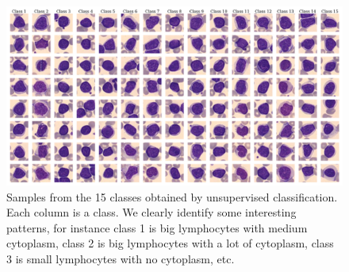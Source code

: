 \documentclass{midl}
\begin{document}
\begin{figure}[H]
    \centering
    \includegraphics[width=\textwidth]{figures/unsupervised_classification.png}
    \caption{Samples from the 15 classes obtained by unsupervised classification. Each column is a class. We clearly identify some interesting patterns, for instance class 1 is big lymphocytes with medium cytoplasm, class 2 is big lymphocytes with a lot of cytoplasm, class 3 is small lymphocytes with no cytoplasm, etc.}
    \label{fig:unsupervised_classification}
\end{figure}
\end{document}
